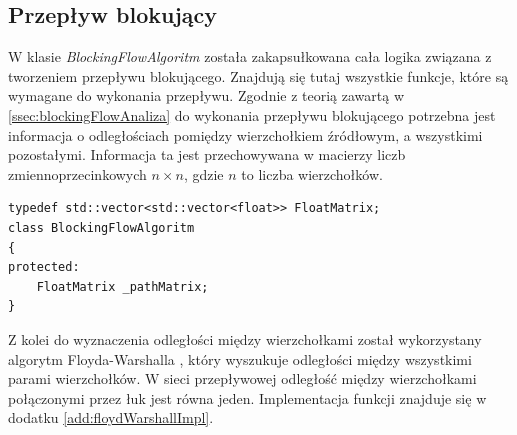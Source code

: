 \subsection{Przepływ blokujący}\label{ssec:blockingFlowWew}
W klasie \emph{BlockingFlowAlgoritm} została zakapsułkowana cała logika związana z tworzeniem przepływu blokującego. Znajdują się tutaj wszystkie funkcje, które są wymagane do wykonania przepływu. Zgodnie z teorią zawartą w \ref{ssec:blockingFlowAnaliza} do wykonania przepływu blokującego potrzebna jest informacja o odległościach pomiędzy wierzchołkiem źródłowym, a wszystkimi pozostałymi. Informacja ta jest przechowywana w macierzy liczb zmiennoprzecinkowych $ n\times n $, gdzie $ n $ to liczba wierzchołków.
\begin{verbatim}
typedef std::vector<std::vector<float>> FloatMatrix;
class BlockingFlowAlgoritm
{
protected:
	FloatMatrix _pathMatrix;
}
\end{verbatim}
Z kolei do wyznaczenia odległości między wierzchołkami został wykorzystany algorytm Floyda-Warshalla \cite{id:AlgorytmyStrukturyFloydWarshall}, który wyszukuje odległości między wszystkimi parami wierzchołków. W sieci przepływowej odległość między wierzchołkami połączonymi przez łuk jest równa jeden. Implementacja funkcji znajduje się w dodatku \ref{add:floydWarshallImpl}.

